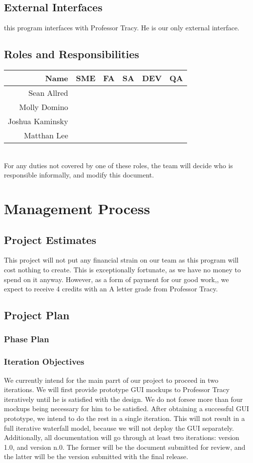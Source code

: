 \documentclass{article}
\newcommand{\role}{\checkmark}
\begin{document}
\subsection{External Interfaces}
this program interfaces with Professor Tracy. He is our only external interface.
\subsection{Roles and Responsibilities}
\begin{tabular}{|r|c|c|c|c|c|}
\hline
Name & SME & FA & SA& DEV& QA \\ \hline
Sean Allred     &       & \role & \role & \role & \role \\ \hline
Molly Domino    & \role &       & \role & \role & \role \\ \hline
Joshua Kaminsky & \role & \role & \role &       & \role \\ \hline
Matthan Lee     & \role & \role &       & \role & \role \\ \hline
\end{tabular}\\
For any duties not covered by one of these roles, the team will decide who is responsible informally, and modify this document.
\section{Management Process}
\subsection{Project Estimates}
This project will not put any financial strain on our team as this program will cost nothing to create. This is exceptionally fortunate, as we have no money to spend on it anyway. However, as a form of payment for our good work,, we expect to receive 4 credits with an A letter grade from Professor Tracy.
\subsection{Project Plan}
\subsubsection{Phase Plan}
\subsubsection{Iteration Objectives}
We currently intend for the main parrt of our project to proceed in two iterations. We will first provide prototype GUI mockups to Professor Tracy iteratively until he is satisfied with the design. We do not forsee more than four mockups being necessary for him to be satisfied. After obtaining a successful GUI prototype, we intend to do the rest in a single iteration. This will not result in a full iterative waterfall model, because we will not deploy the GUI separately. Additionally, all documentation will go through at least two iterations: version 1.0, and version n.0. The former will be the document submitted for review, and the latter will be the version submitted with the final release.
\end{document}
